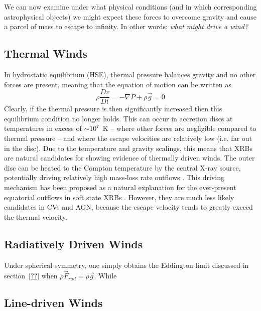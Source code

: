We can now examine under what physical conditions 
(and in which corresponding astrophysical objects)
we might expect these forces to overcome gravity and 
cause a parcel of mass to escape to infinity.
In other words: {\em what might drive a wind?}

\subsection{Thermal Winds}

In hydrostatic equilibrium (HSE), thermal pressure balances gravity and no other forces 
are present, meaning that the equation of motion can be written as 
\begin{equation}
\label{eq:hse}
\rho \frac{Dv}{Dt} = -\nabla P +  \rho \vec{g} = 0
\end{equation}
Clearly, if the thermal pressure is then significantly 
increased then this equilibrium condition no longer holds. 
This can occur in accretion discs at temperatures in excess of $\sim10^7$~K --
where other forces are negligible compared to thermal pressure -- 
and where the escape velocities are relatively low (i.e. far out in the disc).
Due to the temperature and gravity scalings, this means
that XRBs are natural candidates for showing evidence of thermally driven
winds. The outer disc can be heated to the Compton temperature by the central X-ray source,
potentially driving relatively high mass-loss rate outflows \citep{begelman1983,woods1996}. 
This driving mechanism has been proposed as a natural explanation
for the ever-present equatorial outflows in soft state XRBs \citep{ponti2012}.
However, they are much less likely candidates in CVs and AGN, because
the escape velocity tends to greatly exceed the thermal velocity.

\subsection{Radiatively Driven Winds}
\label{sec:rad_winds}

Under spherical symmetry, one simply obtains the Eddington limit discussed
in section~\ref{??} when $\rho \vec{F}_{rad} = \rho \vec{g}$. While 


\subsection{Line-driven Winds}

